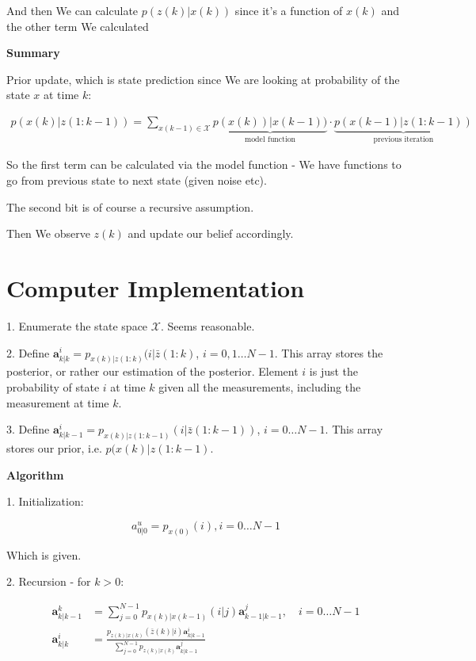 \documentclass{article}
\begin{document}
		And then We can calculate $p(z(k)| x(k))$ since it's a function of $x(k)$ and the other term We calculated 
		
	\textbf{Summary}
		
		Prior update, which is state prediction since We are looking at probability of the state $x$ at time $k$:
		
		\begin{align}
			p(x(k)|z(1:k-1)) = \sum_{x(k-1)\in\mathcal{X}} \underbrace{p(x(k))|x(k-1))}_{\text{model function}}\cdot \underbrace{p(x(k-1)|z(1:k-1))}_{\text{previous iteration}}
		\end{align}
		
		So the first term can be calculated via the model function - We have functions to go from previous state to next state (given noise etc).
		
		The second bit is of course a recursive assumption.
		
		Then We observe $z(k)$ and update our belief accordingly.
		
\section{Computer Implementation}
		
		1. Enumerate the state space $\mathcal{X}$. Seems reasonable.
		
		2. Define $\mathbf{a}^i_{k|k} = p_{x(k)|z(1:k)}(i|\bar{z}(1:k)$, $i=0, 1\ldots N-1$. This array stores the posterior, or rather our estimation of the posterior. Element $i$ is just the probability of state $i$ at time $k$ given all the measurements, including the measurement at time $k$.
		
		3. Define $\mathbf{a}^i_{k|k-1} = p_{x(k)|z(1:k-1)}(i|\bar{z}(1:k-1))$, $i=0\ldots N-1$. This array stores our prior, i.e. $p(x(k)|z(1:k-1)$.
		
		\textbf{Algorithm}
		
		1. Initialization:
		
		\[ a^u_{0|0} = p_{x(0)}(i), i=0\ldots N-1 \]
		
		Which is given.
		
		2. Recursion - for $k>0$:
		
		\begin{align}
			\mathbf{a}^k_{k|k-1} &= \sum^{N-1}_{j=0} p_{x(k)|x(k-1)}(i|j)\mathbf{a}^j_{k-1|k-1},\quad i=0\ldots N-1\\
			\mathbf{a}^i_{k|k} &= \frac{p_{z(k)|x(k)}(\bar{z}(k)|i)\mathbf{a}^i_{k|k-1}}{\sum^{N-1}_{j=0} p_{z(k)|x(k)}\mathbf{a}^j_{k|k-1}}
		\end{align}
		
\end{document}

